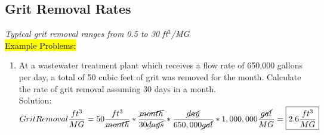 \subsection{Grit Removal Rates}
\emph{Typical grit removal ranges from 0.5 to 30 ft$^3$/MG}\\
\vspace{0.3cm}
\hl{Example Problems:}\\
\begin{enumerate}[1.]
\item At a wastewater treatment plant which receives a flow rate of 650,000 gallons per day, a total of 50 cubic feet of grit was removed for the month. Calculate the rate of grit removal assuming 30 days in a month.\\
Solution:\\
$Grit Removal\dfrac{ft^3}{MG}=50\dfrac{ft^3}{ \cancel{month}}*\dfrac{\cancel{month}}{30\cancel{days}}*\dfrac{\cancel{day}}{650,000\cancel{gal}}*1,000,000\dfrac{\cancel{gal}}{MG}=\boxed{2.6\dfrac{ft^3}{MG}}$
\end{enumerate}
%
%
%
%
%
%
%
